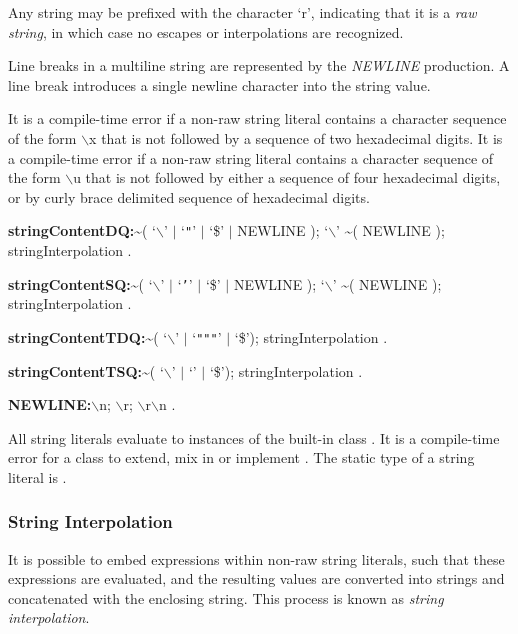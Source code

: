 \documentclass{article}
\begin{document}
\LMHash{}
Any string may be prefixed with the character `r', indicating that it is a {\em raw string}, in which case no escapes or interpolations are recognized.

\LMHash{}
Line breaks in a multiline string are represented by the {\em NEWLINE} production.
A line break introduces a single newline character into the string value.

\LMHash{}
It is a compile-time error if a non-raw string literal contains a character sequence of the form $\backslash$x that is not followed by a sequence of two hexadecimal digits.
It is a compile-time error if a non-raw string literal contains a character sequence of the form $\backslash$u that is not followed by either a sequence of four hexadecimal digits, or by curly brace delimited sequence of hexadecimal digits.

\begin{grammar}
{\bf stringContentDQ:}\~{}( `$\backslash$' $|$ `{\escapegrammar \texttt{"}}' $|$ `\$' $|$ NEWLINE );
  `$\backslash$' \~{}( NEWLINE );
  stringInterpolation
  .

{\bf stringContentSQ:}\~{}( `$\backslash$' $|$ `{\escapegrammar \texttt{'}}' $|$ `\$' $|$ NEWLINE );
  `$\backslash$' \~{}( NEWLINE );
  stringInterpolation
  .

{\bf stringContentTDQ:}\~{}( `$\backslash$' $|$ `{\escapegrammar \texttt{"""}}' $|$ `\$');
  stringInterpolation
  .

{\bf stringContentTSQ:}\~{}( `$\backslash$' $|$ `{\escapegrammar {}}' $|$ `\$');
  stringInterpolation
  .

{\bf NEWLINE:}$\backslash$n;
  $\backslash$r;
  $\backslash$r$\backslash$n
  .
\end{grammar}

\LMHash{}
All string literals evaluate to instances of the built-in class .
It is a compile-time error for a class to extend, mix in or implement .
The static type of a string literal is .


\subsubsection{String Interpolation}

\LMHash{}
It is possible to embed expressions within non-raw string literals, such that these expressions are evaluated, and the resulting values are converted into strings and concatenated with the enclosing string.
This process is known as {\em string interpolation}.
\end{document}
